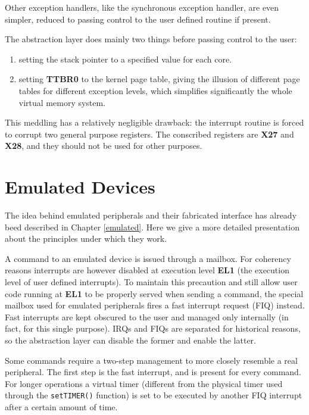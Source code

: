 \documentclass[12pt,a4paper,openright,twoside]{report}
\begin{document}

Other exception handlers, like the synchronous exception handler, are even 
simpler, reduced to passing control to the user defined routine if present.

The abstraction layer does mainly two things before passing control to the user:
\begin{enumerate}
    \item setting the stack pointer to a specified value for each core.
    \item setting \textbf{TTBR0} to the kernel page table, giving the illusion
        of different page tables for different exception levels, which simplifies
        significantly the whole virtual memory system.
\end{enumerate}
This meddling has a relatively negligible drawback: the interrupt routine is forced
to corrupt two general purpose registers.
 The conscribed registers are \textbf{X27}
and \textbf{X28}, and they should not be used for other purposes.

\section{Emulated Devices}
\label{emulateddev}
The idea behind emulated peripherals and their fabricated interface 
has already beed described in Chapter \ref{emulated}. Here we give a more detailed 
presentation about the principles under which they work.

A command to an emulated device is issued through a mailbox. For coherency reasons
interrupts are however disabled at execution level \textbf{EL1} (the execution
level of user defined interrupts). To maintain this precaution and still allow 
user code running at \textbf{EL1} to be properly served when sending a command, the
special mailbox used for emulated peripherals fires a fast interrupt request (FIQ)
instead.
Fast interrupts are kept obscured to the user and managed only internally (in fact,
for this single purpose). IRQs and FIQs are separated for historical reasons, so 
the abstraction layer can disable the former and enable the latter.

Some commands require a two-step management to more closely resemble a real peripheral.
The first step is the fast interrupt, and is present for every command. For longer
operations a virtual timer (different from the physical timer used through the
{\tt setTIMER()} function) is set to be executed by another FIQ interrupt after 
a certain amount of time.
\end{document}
